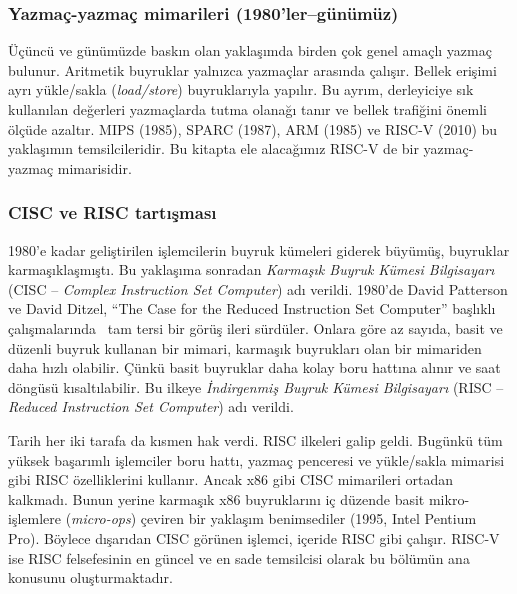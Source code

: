 \subsubsection*{Yazmaç-yazmaç mimarileri (1980'ler--günümüz)}
Üçüncü ve günümüzde baskın olan yaklaşımda birden çok genel amaçlı yazmaç bulunur. Aritmetik buyruklar yalnızca yazmaçlar arasında çalışır. Bellek erişimi ayrı yükle/sakla (\emph{load/store}) buyruklarıyla yapılır. Bu ayrım, derleyiciye sık kullanılan değerleri yazmaçlarda tutma olanağı tanır ve bellek trafiğini önemli ölçüde azaltır. MIPS (1985), SPARC (1987), ARM (1985) ve RISC-V (2010) bu yaklaşımın temsilcileridir. Bu kitapta ele alacağımız RISC-V de bir yazmaç-yazmaç mimarisidir.

\subsubsection*{CISC ve RISC tartışması}
1980'e kadar geliştirilen işlemcilerin buyruk kümeleri giderek büyümüş, buyruklar karmaşıklaşmıştı. Bu yaklaşıma sonradan \emph{Karmaşık Buyruk Kümesi Bilgisayarı} (CISC -- \emph{Complex Instruction Set Computer}) adı verildi. 1980'de David Patterson ve David Ditzel, ``The Case for the Reduced Instruction Set Computer'' başlıklı çalışmalarında~\cite{patterson1980} tam tersi bir görüş ileri sürdüler. Onlara göre az sayıda, basit ve düzenli buyruk kullanan bir mimari, karmaşık buyrukları olan bir mimariden daha hızlı olabilir. Çünkü basit buyruklar daha kolay boru hattına alınır ve saat döngüsü kısaltılabilir. Bu ilkeye \emph{İndirgenmiş Buyruk Kümesi Bilgisayarı} (RISC -- \emph{Reduced Instruction Set Computer}) adı verildi.

Tarih her iki tarafa da kısmen hak verdi. RISC ilkeleri galip geldi. Bugünkü tüm yüksek başarımlı işlemciler boru hattı, yazmaç penceresi ve yükle/sakla mimarisi gibi RISC özelliklerini kullanır. Ancak x86 gibi CISC mimarileri ortadan kalkmadı. Bunun yerine karmaşık x86 buyruklarını iç düzende basit mikro-işlemlere (\emph{micro-ops}) çeviren bir yaklaşım benimsediler (1995, Intel Pentium Pro). Böylece dışarıdan CISC görünen işlemci, içeride RISC gibi çalışır. RISC-V ise RISC felsefesinin en güncel ve en sade temsilcisi olarak bu bölümün ana konusunu oluşturmaktadır.

